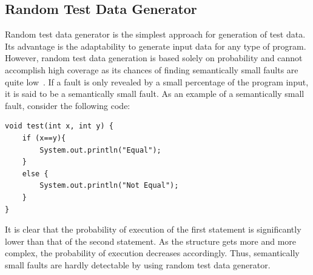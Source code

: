 

\subsection{Random Test Data Generator}
\label{sec:randomgenerator_2}
Random test data generator is the simplest approach for generation of test data. Its advantage is the adaptability to generate input data for any type of program. However, random test data generation is based solely on probability and cannot accomplish high coverage as its chances of finding semantically small faults are quite low~\cite{godefroid2005dart}. If a fault is only revealed by a small percentage of the program input, it is said to be a semantically small fault. As an example of a semantically small fault, consider the following code:
\bigskip
\begin{lstlisting}
void test(int x, int y) {
    if (x==y){
        System.out.println("Equal");
    }
    else {
        System.out.println("Not Equal");
    }
}
\end{lstlisting}
\bigskip

It is clear that the probability of execution of the first statement is significantly lower than that of the second statement. As the structure gets more and more complex, the probability of execution decreases accordingly. Thus, semantically small faults are hardly detectable by using random test data generator. 



